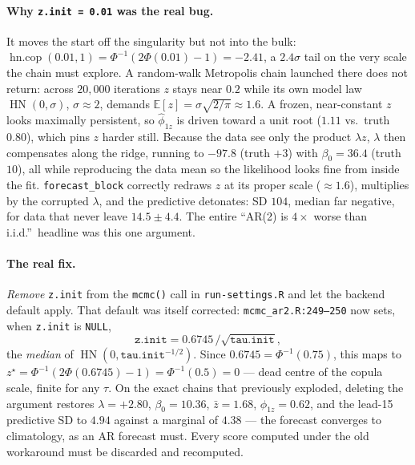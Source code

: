 \documentclass[11pt]{article}
\theoremstyle{definition}
\theoremstyle{remark}
\newcommand{\E}{\mathbb{E}}
\newcommand{\hn}{\operatorname{HN}}
\begin{document}
\paragraph{Why \texttt{z.init = 0.01} was the real bug.}
It moves the start off the singularity but not into the bulk:
$\operatorname{hn.cop}(0.01, 1) = \Phi^{-1}(2\Phi(0.01)-1) = -2.41$, a
$2.4\sigma$ tail on the very scale the chain must explore. A random-walk
Metropolis chain launched there does not return: across $20{,}000$
iterations $z$ stays near $0.2$ while its own model law $\hn(0,\sigma)$,
$\sigma\approx 2$, demands $\E[z]=\sigma\sqrt{2/\pi}\approx 1.6$. A frozen,
near-constant $z$ looks maximally persistent, so $\hat\phi_{1z}$ is driven
toward a unit root ($1.11$ vs.\ truth $0.80$), which pins $z$ harder still.
Because the data see only the product $\lambda z$, $\lambda$ then
compensates along the ridge, running to $-97.8$ (truth $+3$) with
$\beta_0 = 36.4$ (truth $10$), all while reproducing the data mean so the
likelihood looks fine from inside the fit. \texttt{forecast\_block}
correctly redraws $z$ at its proper scale ($\approx 1.6$), multiplies by
the corrupted $\lambda$, and the predictive detonates: SD $104$, median far
negative, for data that never leave $14.5\pm4.4$. The entire ``AR(2) is
$4\times$ worse than i.i.d.''\ headline was this one argument.

\paragraph{The real fix.}
\emph{Remove} \texttt{z.init} from the \texttt{mcmc()} call in
\texttt{run-settings.R} and let the backend default apply. That default was
itself corrected: \texttt{mcmc\_ar2.R:249--250} now sets, when
\texttt{z.init} is \texttt{NULL},
\begin{equation*}
  \texttt{z.init} = 0.6745\,/\!\sqrt{\texttt{tau.init}},
\end{equation*}
the \emph{median} of $\hn(0,\texttt{tau.init}^{-1/2})$. Since
$0.6745 = \Phi^{-1}(0.75)$, this maps to
$z^\star = \Phi^{-1}(2\Phi(0.6745)-1) = \Phi^{-1}(0.5) = 0$ --- dead centre
of the copula scale, finite for any $\tau$. On the exact chains that
previously exploded, deleting the argument restores $\lambda = +2.80$,
$\beta_0 = 10.36$, $\bar z = 1.68$, $\phi_{1z} = 0.62$, and the lead-15
predictive SD to $4.94$ against a marginal of $4.38$ --- the forecast
converges to climatology, as an AR forecast must. Every score computed
under the old workaround must be discarded and recomputed.
\end{document}
